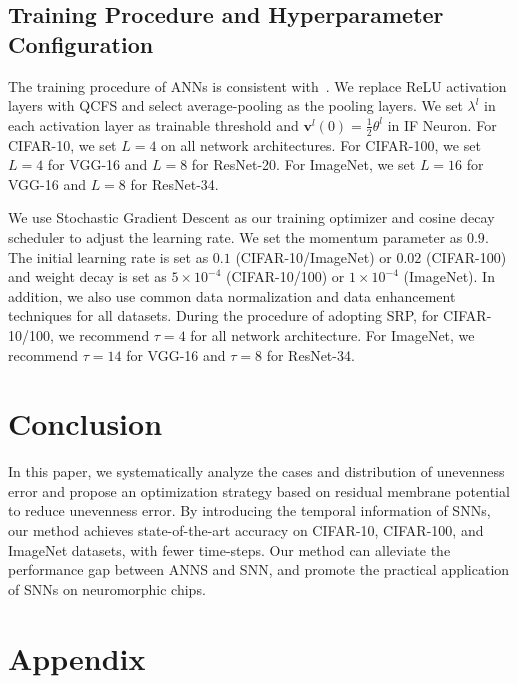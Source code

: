 \documentclass[letterpaper]{article} %
\begin{document}
\subsection{Training Procedure and Hyperparameter Configuration}

The training procedure of ANNs is consistent with~\cite{bu2022optimal}. We replace ReLU activation layers with QCFS and select average-pooling as the pooling layers. We set $\lambda^l$ in each activation layer as trainable threshold and $\boldsymbol{v}^l(0)=\frac{1}{2}\theta^l$ in IF Neuron. For CIFAR-10, we set $L=4$ on all network architectures. For CIFAR-100, we set $L=4$ for VGG-16 and $L=8$ for ResNet-20. For ImageNet, we set $L=16$ for VGG-16 and $L=8$ for ResNet-34.


We use Stochastic Gradient Descent \cite{bottou2012stochastic} as our training  optimizer and cosine decay scheduler \cite{loshchilov2016sgdr} to adjust the learning rate. We set the momentum parameter as $0.9$. The initial learning rate is set as $0.1$ (CIFAR-10/ImageNet) or $0.02$ (CIFAR-100) and weight decay is set as $5\times10^{-4}$ (CIFAR-10/100) or $1\times10^{-4}$ (ImageNet). In addition, we also use common data normalization and data enhancement techniques \cite{devries2017improved,Ekin2019,li2021free} for all datasets. During the procedure of adopting SRP, for CIFAR-10/100, we recommend $\tau=4$ for all network architecture. For ImageNet, we recommend $\tau=14$ for VGG-16 and $\tau=8$ for ResNet-34. 





\section{Conclusion}
In this paper, we systematically analyze the cases and distribution of unevenness error and propose an optimization strategy based on residual membrane potential to reduce unevenness error. By introducing the temporal information of SNNs, our method achieves state-of-the-art accuracy on CIFAR-10, CIFAR-100, and ImageNet datasets, with fewer time-steps. Our method can alleviate the performance gap between ANNS and SNN, and promote the practical application of SNNs on 
neuromorphic chips.



\appendix
\section{Appendix}
\end{document}
